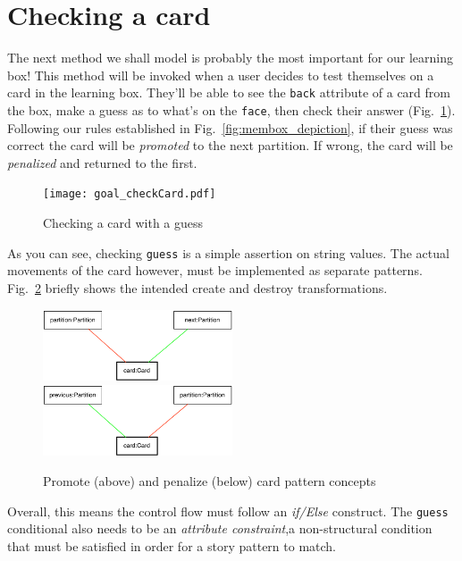 \newpage
\hypertarget{sec:checkCard}{}
\section{Checking a card}
\genHeader

The next method we shall model is probably the most important for our learning box! This method will be invoked when a user decides to test themselves on a card
in the learning box. They'll be able to see the \texttt{back} attribute of a card from the box, make a guess as to what's on the \texttt{face}, then 
check their answer (Fig.~\ref{fig:goal_check}). Following our rules established in Fig.~\ref{fig:membox_depiction}, if their guess was correct the card will be
\emph{promoted} to the next partition. If wrong, the card will be \emph{penalized} and returned to the first.

\begin{figure}[htbp]
 	\centering
   \texttt{[image: goal\_checkCard.pdf]}
 	\caption{Checking a card with a guess}
 	\label{fig:goal_check}
\end{figure}
\FloatBarrier

As you can see, checking \texttt{guess} is a simple assertion on string values. The actual movements of the card however, must be implemented as separate
patterns. Fig.~\ref{fig:patterns_check} briefly shows the intended create and destroy transformations.

\begin{figure}[htbp]
 	\centering
   \includegraphics[width=0.5\textwidth]{checkCard_promote.pdf}
   \\ \vspace{1cm}
    \includegraphics[width=0.5\textwidth]{checkCard_penalize.pdf}
 	\caption{Promote (above) and penalize (below) card pattern concepts}
 	\label{fig:patterns_check}
\end{figure}
\FloatBarrier

Overall, this means the control flow must follow an \emph{if/Else} construct. The \texttt{guess} conditional also needs to be an \emph{attribute
constraint},a non-structural condition that must be satisfied in order for a story pattern to match. 





